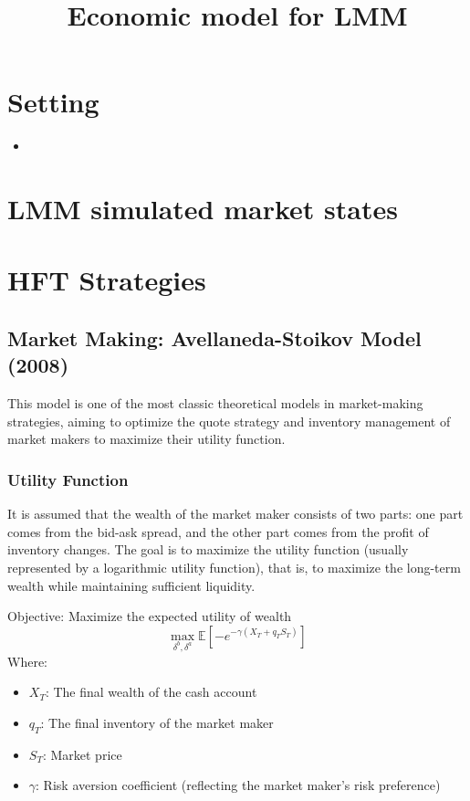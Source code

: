 \documentclass[12pt, oneside]{article}
\title{Economic model for LMM}
\numberwithin{equation}{section}
\begin{document}
\maketitle

\section{Setting}
\begin{itemize}
    \item 
\end{itemize}


\section{LMM simulated market states}

\section{HFT Strategies}

\subsection{Market Making: Avellaneda-Stoikov Model (2008)}

This model is one of the most classic theoretical models in market-making strategies, aiming to optimize the quote strategy and inventory management of market makers to maximize their utility function.

\subsubsection{Utility Function}

It is assumed that the wealth of the market maker consists of two parts: one part comes from the bid-ask spread, and the other part comes from the profit of inventory changes. The goal is to maximize the utility function (usually represented by a logarithmic utility function), that is, to maximize the long-term wealth while maintaining sufficient liquidity.

Objective: Maximize the expected utility of wealth
\[
\max_{\delta^b, \delta^a} \mathbb{E} \left[ -e^{-\gamma (X_T + q_T S_T)} \right]
\]
Where:
\begin{itemize}
    \item \(X_T\): The final wealth of the cash account
    \item \(q_T\): The final inventory of the market maker
    \item \(S_T\): Market price
    \item \(\gamma\): Risk aversion coefficient (reflecting the market maker's risk preference)
\end{itemize}
\end{document}
